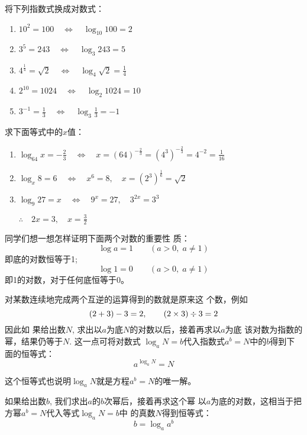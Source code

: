 \begin{example}
    将下列指数式换成对数式：
\begin{enumerate}
    \item $10^2=100\quad \Longleftrightarrow \quad \log_{10}100= 2$
    \item $3^5=243\quad \Longleftrightarrow \quad\log_3 243=5$
    \item $4^{\tfrac{1}{4}}=\sqrt{2}\quad \Longleftrightarrow \quad \log_4\sqrt{2}=\frac{1}{4}$
    \item $2^10=1024\quad \Longleftrightarrow \quad \log_2 1024=10$
    \item $3^{-1}=\frac{1}{3}\quad \Longleftrightarrow \quad \log_3\frac{1}{3}=-1$
\end{enumerate}
\end{example}



\begin{example}
    求下面等式中的$x$值：
\begin{enumerate}
    \item $\log_{64}x=-\frac{2}{3}  \quad \Longleftrightarrow \quad x=(64)^{-\tfrac{2}{3}}=\left(4^3\right)^{-\tfrac{2}{3}}=4^{-2}=\frac{1}{16} $
    \item  $ \log_x 8 =6 \quad \Longleftrightarrow \quad x^6=8,\quad x=(2^3)^{\tfrac{1}{6}}=\sqrt{2} $
    \item  $ \log_9 27=x \quad \Longleftrightarrow \quad 9^x=27,\quad 3^{2x}=3^3 $
    
    $\therefore\quad 2x=3,\quad x=\frac{3}{2}$
\end{enumerate}
\end{example}

同学们想一想怎样证明下面两个对数的重要性
质：
\[\log a=1\qquad (a>0,\; a\ne 1)\]
即底的对数恒等于1;
\[\log 1=0\qquad (a>0,\; a\ne 1)\]
即1的对数，对于任何底恒等于0。

对某数连续地完成两个互逆的运算得到的数就是原来这
个数，例如
$$(2+3)-3=2,\qquad (2\times3)\div 3=2$$
因此如
果给出数$N$, 求出以$a$为底$N$的对数以后，接着再求以$a$为底
该对数为指数的幂，结果仍等于$N$. 这一点可将对数式
$\log_a N=b$代入指数式$a^b=N$中的$b$得到下面的恒等式：
\begin{equation}
    a^{\log_a N}=N
\end{equation}

这个恒等式也说明$\log_a N$就是方程$a^b=N$的唯一解。

如果给出数$b$, 我们求出$a$的$b$次幂后，接着再求这个幂
以$a$为底的对数，这相当于把方幂$a^b=N$代入等式$\log_a N=b$中
的真数$N$得到恒等式：
\begin{equation}
    b=\log_a a^b
\end{equation}



